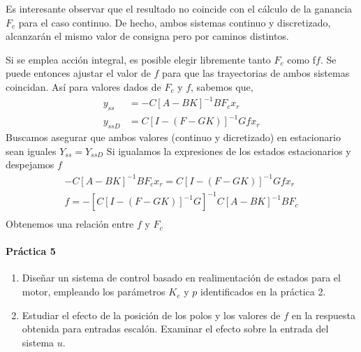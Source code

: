\documentclass[10pt,a4paper]{report}
\begin{document}
Es interesante observar que el resultado no coincide con el cálculo de la ganancia $F_c$ para el caso continuo. De hecho, ambos sistemas continuo y discretizado, alcanzarán el mismo valor de consigna pero por caminos distintos. 

Si se emplea acción integral, es posible elegir libremente tanto $F_c$ como f$f$. Se puede entonces ajustar el valor de $f$ para que las trayectorias de ambos sistemas coincidan. Así para valores dados de $F_c$ y $f$, sabemos que,
\begin{align}
y_{ss}  &= -C\left[A-BK\right]^{-1}BF_cx_r\\
y_{ssD} &= C\left[I-(F-GK) \right]^{-1}Gfx_r
\end{align}
Buscamos asegurar que ambos valores (continuo y dicretizado) en estacionario sean iguales $Y_{ss} = Y_{ssD}$ Si igualamos la expresiones de los estados estacionarios y despejamos $f$
\begin{align}
-C\left[A-BK\right]^{-1}BF_cx_r = C\left[I-(F-GK) \right]^{-1}Gfx_r\\
f = -\left[C\left[I-(F-GK) \right]^{-1}G\right]^{-1}C\left[A-BK\right]^{-1}BF_c  \\\label{eq429}
\end{align}
Obtenemos una relación entre $f$ y $F_c$

\paragraph{Práctica 5}
\begin{enumerate}
\item Diseñar un sistema de control basado en realimentación de estados para el motor, empleando los parámetros $K_e$ y $p$ identificados en la práctica 2.
\item Estudiar el efecto de la posición de los polos y los valores de $f$ en la respuesta obtenida para entradas escalón. Examinar el efecto sobre la entrada del sistema $u$. 
\end{enumerate}
\end{document}
